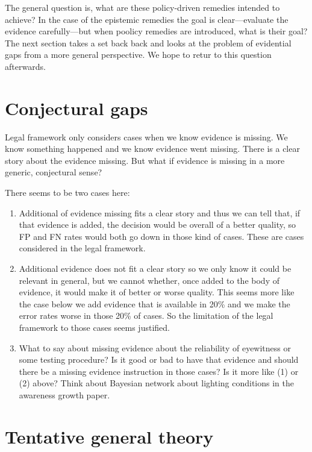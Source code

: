 \documentclass[
  10pt,
  dvipsnames,enabledeprecatedfontcommands]{scrartcl}
\begin{document}
The general question is, what are these policy-driven remedies intended
to achieve? In the case of the epistemic remedies the goal is
clear---evaluate the evidence carefully---but when poolicy remedies are
introduced, what is their goal? The next section takes a set back back
and looks at the problem of evidential gaps from a more general
perspective. We hope to retur to this question afterwards.

\hypertarget{conjectural-gaps}{%
\section{Conjectural gaps}\label{conjectural-gaps}}

Legal framework only considers cases when we know evidence is missing.
We know something happened and we know evidence went missing. There is a
clear story about the evidence missing. But what if evidence is missing
in a more generic, conjectural sense?

There seems to be two cases here:

\begin{enumerate}
\def\labelenumi{(\arabic{enumi})}
\item
  Additional of evidence missing fits a clear story and thus we can tell
  that, if that evidence is added, the decision would be overall of a
  better quality, so FP and FN rates would both go down in those kind of
  cases. These are cases considered in the legal framework.
\item
  Additional evidence does not fit a clear story so we only know it
  could be relevant in general, but we cannot whether, once added to the
  body of evidence, it would make it of better or worse quality. This
  seems more like the case below we add evidence that is available in
  20\% and we make the error rates worse in those 20\% of cases. So the
  limitation of the legal framework to those cases seems justified.
\item
  What to say about missing evidence about the reliability of eyewitness
  or some testing procedure? Is it good or bad to have that evidence and
  should there be a missing evidence instruction in those cases? Is it
  more like (1) or (2) above? Think about Bayesian network about
  lighting conditions in the awareness growth paper.
\end{enumerate}

\hypertarget{tentative-general-theory}{%
\section{Tentative general theory}\label{tentative-general-theory}}
\end{document}
